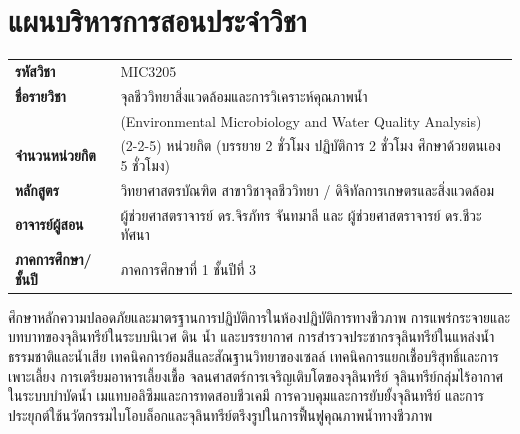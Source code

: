 \chapter*{แผนบริหารการสอนประจำวิชา}

\begin{tcolorbox}[enhanced, colback=white, colframe=waterNavy, colbacktitle=waterNavy,
    coltitle=white, fonttitle=\bfseries\normalsize,
    title={ข้อมูลทั่วไปของรายวิชา},
    arc=2mm, boxrule=0.8pt, leftrule=4mm,
    top=8pt, bottom=8pt, left=10pt, right=10pt]
\begin{tabularx}{\textwidth}{l>{\raggedright\arraybackslash}X}
\textbf{รหัสวิชา} & MIC3205 \\
\textbf{ชื่อรายวิชา} & จุลชีววิทยาสิ่งแวดล้อมและการวิเคราะห์คุณภาพน้ำ \\
 & (Environmental Microbiology and Water Quality Analysis) \\
\textbf{จำนวนหน่วยกิต} & 3(2-2-5) หน่วยกิต (บรรยาย 2 ชั่วโมง ปฏิบัติการ 2 ชั่วโมง ศึกษาด้วยตนเอง 5 ชั่วโมง) \\
\textbf{หลักสูตร} & วิทยาศาสตรบัณฑิต สาขาวิชาจุลชีววิทยา / ดิจิทัลการเกษตรและสิ่งแวดล้อม \\
\textbf{อาจารย์ผู้สอน} & ผู้ช่วยศาสตราจารย์ ดร.จิรภัทร จันทมาลี และ ผู้ช่วยศาสตราจารย์ ดร.ชีวะ ทัศนา \\
\textbf{ภาคการศึกษา/ชั้นปี} & ภาคการศึกษาที่ 1 ชั้นปีที่ 3 \\
\end{tabularx}
\end{tcolorbox}

\begin{tcolorbox}[enhanced, colback=cleanSky!25!white, colframe=oceanTeal, colbacktitle=oceanTeal,
    coltitle=white, fonttitle=\bfseries\normalsize,
    title={คำอธิบายรายวิชา (Course Description)},
    arc=2mm, boxrule=0.8pt, leftrule=4mm,
    top=8pt, bottom=8pt, left=10pt, right=10pt, before skip=8pt]
ศึกษาหลักความปลอดภัยและมาตรฐานการปฏิบัติการในห้องปฏิบัติการทางชีวภาพ การแพร่กระจายและบทบาทของจุลินทรีย์ในระบบนิเวศ ดิน น้ำ และบรรยากาศ การสำรวจประชากรจุลินทรีย์ในแหล่งน้ำธรรมชาติและน้ำเสีย เทคนิคการย้อมสีและสัณฐานวิทยาของเซลล์ เทคนิคการแยกเชื้อบริสุทธิ์และการเพาะเลี้ยง การเตรียมอาหารเลี้ยงเชื้อ จลนศาสตร์การเจริญเติบโตของจุลินทรีย์ จุลินทรีย์กลุ่มไร้อากาศในระบบบำบัดน้ำ เมแทบอลิซึมและการทดสอบชีวเคมี การควบคุมและการยับยั้งจุลินทรีย์ และการประยุกต์ใช้นวัตกรรมไบโอบล็อกและจุลินทรีย์ตรึงรูปในการฟื้นฟูคุณภาพน้ำทางชีวภาพ
\end{tcolorbox}

